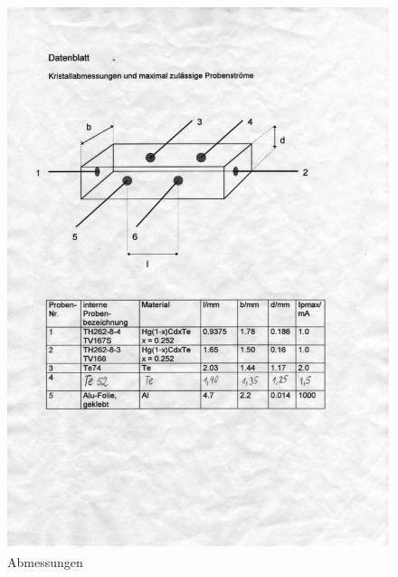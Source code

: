 \begin{figure}[htb!]
 \centering
 \includegraphics[viewport=40 420 470 700,clip]{../docs/scan_datenblatt}
 \caption{Abmessungen}
 \label{fig:abmessungen}
\end{figure}



